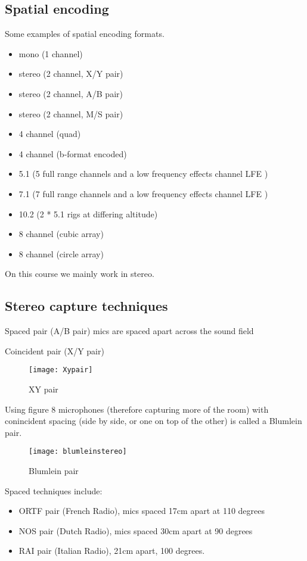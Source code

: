 \subsection{Spatial encoding}
Some examples of spatial encoding formats.
\begin{itemize}
\item mono (1 channel)
\item stereo (2 channel, X/Y pair)
\item stereo (2 channel, A/B pair)
\item stereo (2 channel, M/S pair)
\item 4 channel (quad)
\item 4 channel (b-format encoded)
\item 5.1 (5 full range channels and a low frequency effects channel LFE )
\item 7.1 (7 full range channels and a low frequency effects channel LFE )
\item 10.2 (2 * 5.1 rigs at differing altitude)
\item 8 channel (cubic array)
\item 8 channel (circle array)
\end{itemize}

On this course we mainly work in stereo.



\subsection{Stereo capture techniques}

Spaced pair (A/B pair) mics are spaced apart across the sound field

Coincident pair (X/Y pair)

\begin{figure}[H]
\centering
\texttt{[image: Xypair]}\caption{XY pair}
\label{fig:xypair}
\end{figure}

Using figure 8 microphones (therefore capturing more of the room) with conincident spacing (side by side, or one on top of the other) is called a Blumlein pair. 

\begin{figure}[H]
\centering
\texttt{[image: blumleinstereo]}\caption{Blumlein pair}
\label{fig:blumleinpair}
\end{figure}

Spaced techniques include:
\begin{itemize}
\item ORTF pair (French Radio), mics spaced 17cm apart at 110 degrees
\item NOS pair (Dutch Radio), mics spaced 30cm apart at 90 degrees
\item RAI pair (Italian Radio), 21cm apart, 100 degrees. 
\end{itemize}

